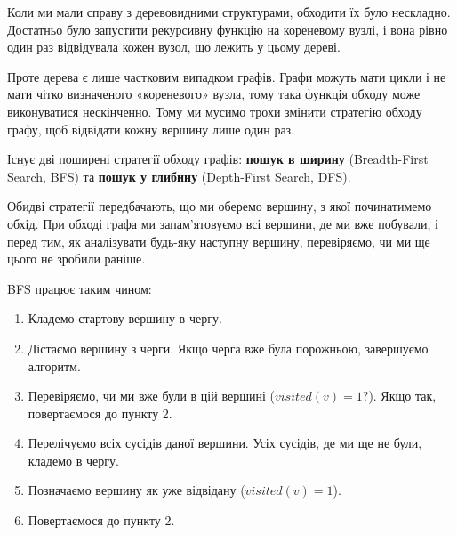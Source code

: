 \documentclass[12pt,a4paper]{report}
\begin{document}
Коли ми мали справу з деревовидними структурами, обходити їх було нескладно. Достатньо було запустити рекурсивну функцію на кореневому вузлі, і вона рівно один раз відвідувала кожен вузол, що лежить у цьому дереві.

Проте дерева є лише частковим випадком графів. Графи можуть мати цикли і не мати чітко визначеного «кореневого» вузла, тому така функція обходу може виконуватися нескінченно. Тому ми мусимо трохи змінити стратегію обходу графу, щоб відвідати кожну вершину лише один раз.

Існує дві поширені стратегії обходу графів: \textbf{пошук в ширину} (Breadth-First Search, BFS) та \textbf{пошук у глибину} (Depth-First Search, DFS).

Обидві стратегії передбачають, що ми оберемо вершину, з якої починатимемо обхід. При обході графа ми запам’ятовуємо всі вершини, де ми вже побували, і перед тим, як аналізувати будь-яку наступну вершину, перевіряємо, чи ми ще цього не зробили раніше.

BFS працює таким чином:

\begin{enumerate}
    \item Кладемо стартову вершину в чергу.
    \item Дістаємо вершину з черги. Якщо черга вже була порожньою, завершуємо алгоритм.
    \item Перевіряємо, чи ми вже були в цій вершині (\(visited(v) = 1?\)). Якщо так, повертаємося до пункту 2.
    \item Перелічуємо всіх сусідів даної вершини. Усіх сусідів, де ми ще не були, кладемо в чергу.
    \item Позначаємо вершину як уже відвідану (\(visited(v) = 1\)).
    \item Повертаємося до пункту 2.
\end{enumerate}

\begin{center}
\end{center}
\end{document}
